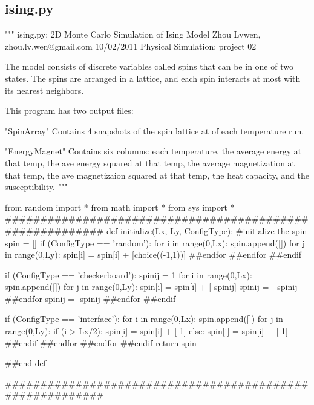 \documentclass[11pt,a4paper,boxed]{caspset}
\begin{document}
\newpage
\appendix
\appendixpage
\begin{subappendices}
\section{ising.py}
\begin{python}
"""
ising.py: 2D Monte Carlo Simulation of Ising Model
Zhou Lvwen, zhou.lv.wen@gmail.com
10/02/2011
Physical Simulation: project 02

The model consists of discrete variables called spins that can
be in one of two states. The spins are arranged in a lattice,
and each spin interacts at most with its nearest neighbors.

This program has two output files:

     "SpinArray"     Contains 4 snapshots of the spin lattice at
                     of each temperature run.

     "EnergyMagnet"  Contains six columns: each temperature, the
                     average energy at that temp, the ave energy
                     squared at that temp, the average magnetization
                     at that temp, the ave magnetizaion squared at
                     that temp, the heat capacity, and the
                     susceptibility.
"""

from random import *
from math import *
from sys import *
#########################################################
def initialize(Lx, Ly, ConfigType):
#initialize the spin
   spin = []
   if (ConfigType == 'random'):
      for i in range(0,Lx):
          spin.append([])
          for j in range(0,Ly):
              spin[i] = spin[i] + [choice((-1,1))]
          ##endfor
      ##endfor
   ##endif

   if (ConfigType == 'checkerboard'):
      spinij = 1
      for i in range(0,Lx):
          spin.append([])
          for j in range(0,Ly):
              spin[i] = spin[i] + [-spinij]
              spinij = - spinij
          ##endfor
          spinij = -spinij
      ##endfor
   ##endif

   if (ConfigType == 'interface'):
      for i in range(0,Lx):
          spin.append([])
          for j in range(0,Ly):
              if (i > Lx/2):
                 spin[i] = spin[i] + [ 1]
              else:
                 spin[i] = spin[i] + [-1]
              ##endif
          ##endfor
      ##endfor
   ##endif
   return spin

##end def

#########################################################


\end{python}
\end{subappendices}
\end{document}
